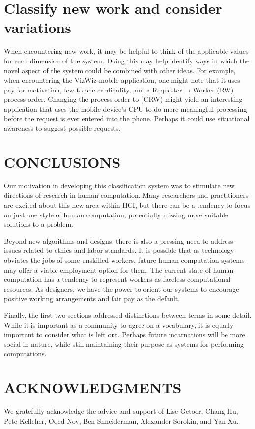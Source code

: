 \documentclass{acm_proc_article-sp}
\begin{document}
\section*{Classify new work and consider variations}
When encountering new work, it may be helpful to think of the applicable values for each dimension of the system. Doing this may help identify ways in which the novel aspect of the system could be combined with other ideas. For example, when encountering the VizWiz mobile application, one might note that it uses pay for motivation, few-to-one cardinality, and a Requester$\rightarrow$Worker (RW) process order. Changing the process order to (CRW) might yield an interesting application that uses the mobile device's CPU to do more meaningful processing before the request is ever entered into the phone. Perhaps it could use situational awareness to suggest possible requests.
\section*{CONCLUSIONS}
Our motivation in developing this classification system was to stimulate new directions of research in human computation. Many researchers and practitioners are excited about this new area within HCI, but there can be a tendency to focus on just one style of human computation, potentially missing more suitable solutions to a problem.

Beyond new algorithms and designs, there is also a pressing need to address issues related to ethics and labor standards. It is possible that as technology obviates the jobs of some unskilled workers, future human computation systems may offer a viable employment option for them. The current state of human computation has a tendency to represent workers as faceless computational resources. As designers, we have the power to orient our systems to encourage positive working arrangements and fair pay as the default.

Finally, the first two sections addressed distinctions between terms in some detail. While it is important as a community to agree on a vocabulary, it is equally important to consider what is left out. Perhaps future incarnations will be more social in nature, while still maintaining their purpose as systems for performing computations.
\section*{ACKNOWLEDGMENTS}
We gratefully acknowledge the advice and support of Lise Getoor, Chang Hu, Pete Kelleher, Oded Nov, Ben Shneiderman, Alexander Sorokin, and Yan Xu.




\balancecolumns
\end{document}
